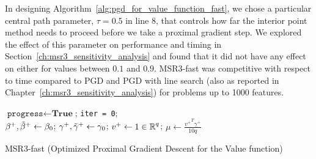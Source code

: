 In designing Algorithm~\ref{alg:pgd_for_value_function_fast}, we chose a particular central path parameter, $\tau = 0.5$ in line 8, 
that controls how far the interior point method needs to proceed before we take a proximal gradient step. We explored the effect of this parameter
on performance and timing in Section~\ref{ch:msr3_sensitivity_analysis} and found that it did not have any effect on either for values between $0.1$ and $0.9$. MSR3-fast 
was competitive with respect to time compared to PGD and PGD with line search (also as reported in Chapter~\ref{ch:msr3_sensitivity_analysis}) for problems up to 1000 features. 

\begin{algorithm}[h!]
\SetAlgoLined
$\texttt{progress}\leftarrow \textbf{True}$; \quad \texttt{iter = 0}; \\
$\beta^+, \tilde\beta^+\leftarrow\beta_0$; 
\quad $\gamma^+, \tilde\gamma^+\leftarrow\gamma_0$;  
\quad $v^+ \leftarrow 1 \in \operatorname{\mathbb{R}}^q$; 
\quad  $\mu \leftarrow \frac{{v^+}^T\gamma^+}{10 q}$\\
 \Return{$\tbeta^+$, $\tgamma^+$}
 \caption{\label{alg:pgd_for_value_function_fast}MSR3-fast (Optimized Proximal Gradient Descent for the Value function)}
\end{algorithm}


